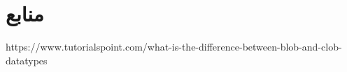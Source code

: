 \documentclass{article}
\begin{document}
\section*{منابع}
\renewcommand{\section}[2]{}%
\begin{thebibliography}{99} %


\begin{LTRitems}

\resetlatinfont

 https://www.tutorialspoint.com/what-is-the-difference-between-blob-and-clob-datatypes
\end{LTRitems}

\end{thebibliography}
\end{document}
